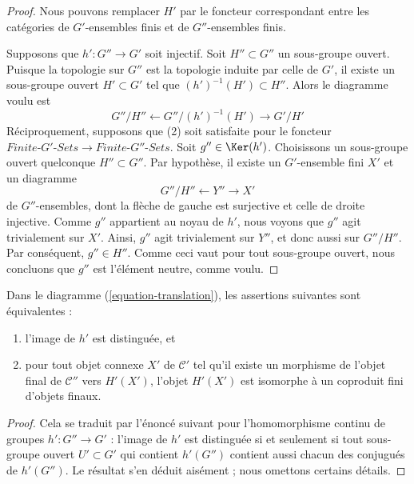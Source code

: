 \begin{proof}
Nous pouvons remplacer $H'$ par le foncteur correspondant entre les catégories
de $G'$-ensembles finis et de $G''$-ensembles finis.

\medskip\noindent
Supposons que $h' : G'' \to G'$ soit injectif. Soit $H'' \subset G''$
un sous-groupe ouvert. Puisque la topologie sur $G''$ est la topologie induite
par celle de $G'$, il existe un sous-groupe ouvert $H' \subset G'$
tel que $(h')^{-1}(H') \subset H''$.
Alors le diagramme voulu est
$$
G''/H'' \leftarrow G''/(h')^{-1}(H') \rightarrow G'/H'
$$
Réciproquement, supposons que (2) soit satisfaite pour le foncteur
$\textit{Finite-}G'\textit{-Sets} \to \textit{Finite-}G''\textit{-Sets}$.
Soit $g'' \in \Ker(h')$. Choisissons un sous-groupe ouvert quelconque $H'' \subset G''$.
Par hypothèse, il existe un $G'$-ensemble fini $X'$ et un diagramme
$$
G''/H'' \leftarrow Y'' \rightarrow X'
$$
de $G''$-ensembles, dont la flèche de gauche est surjective et celle de droite injective.
Comme $g''$ appartient au noyau de $h'$, nous voyons que $g''$ agit trivialement sur $X'$.
Ainsi, $g''$ agit trivialement sur $Y''$, et donc aussi sur $G''/H''$.
Par conséquent, $g'' \in H''$. Comme ceci vaut pour tout sous-groupe ouvert, nous concluons
que $g''$ est l'élément neutre, comme voulu.
\end{proof}

\begin{lemma}
\label{lemma-functoriality-galois-normal}
Dans le diagramme (\ref{equation-translation}), les assertions suivantes sont équivalentes :
\begin{enumerate}
\item l'image de $h'$ est distinguée, et
\item pour tout objet connexe $X'$ de $\mathcal{C}'$ tel
qu'il existe un morphisme de l'objet final de $\mathcal{C}''$
vers $H'(X')$, l'objet $H'(X')$ est isomorphe à un coproduit fini
d'objets finaux.
\end{enumerate}
\end{lemma}

\begin{proof}
Cela se traduit par l'énoncé suivant pour l'homomorphisme continu
de groupes $h' : G'' \to G'$ : l'image de $h'$ est distinguée
si et seulement si tout sous-groupe ouvert $U' \subset G'$ qui
contient $h'(G'')$ contient aussi chacun des conjugués de $h'(G'')$.
Le résultat s'en déduit aisément ; nous omettons certains détails.
\end{proof}






